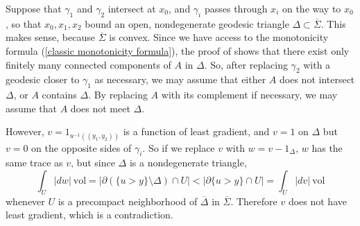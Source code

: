 \documentclass[reqno,12pt,letterpaper]{amsart}
\newcommand{\vol}{\mathrm{vol}}
\theoremstyle{definition}
\numberwithin{equation}{section}
\begin{document}
Suppose that $\gamma_1$ and $\gamma_2$ intersect at $x_0$, and $\gamma_i$ passes through $x_i$ on the way to $x_0$, so that $x_0, x_1, x_2$ bound an open, nondegenerate geodesic triangle $\Delta \subset \overline \Sigma$. This makes sense, because $\overline \Sigma$ is convex.
Since we have access to the monotonicity formula (\ref{classic monotonicity formula}), the proof of \cite[Remark 37.9]{simon1983GMT} shows that there exist only finitely many connected components of $A$ in $\Delta$.
So, after replacing $\gamma_2$ with a geodesic closer to $\gamma_1$ as necessary, we may assume that either $A$ does not intersect $\Delta$, or $A$ contains $\Delta$.
By replacing $A$ with its complement if necessary, we may assume that $A$ does not meet $\Delta$.

However, $v = 1_{u^{-1}((y_1, y_2))}$ is a function of least gradient, and $v = 1$ on $\Delta$ but $v = 0$ on the opposite sides of $\gamma_i$.
So if we replace $v$ with $w = v - 1_\Delta$, $w$ has the same trace as $v$, but since $\Delta$ is a nondegenerate triangle,
$$\int_U |dw| ~\vol = |\partial(\{u > y\} \setminus \Delta) \cap U| < |\partial \{u > y\} \cap U| = \int_U |dv| ~\vol$$
whenever $U$ is a precompact neighborhood of $\overline \Delta$ in $\overline \Sigma$.
Therefore $v$ does not have least gradient, which is a contradiction.





\printbibliography
\end{document}
